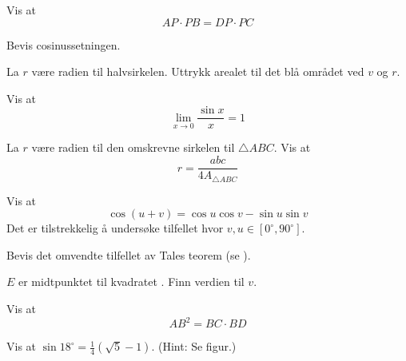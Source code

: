Vis at 
\[ AP\cdot PB = DP\cdot PC \]

\newpage
{}
Bevis cosinussetningen.

La $ r $ være radien til halvsirkelen. Uttrykk arealet til det blå området ved $ v $ og $ r $.

Vis at 
\[\lim\limits_{x\to0} \frac{\sin x}{x}=1 \]

La $ r $ være radien til den omskrevne sirkelen til $ \triangle ABC $. Vis at
\[ r=\frac{abc}{4A_{\triangle ABC}} \]

Vis at
\[ \cos(u+v)= \cos u\cos v-\sin u \sin v \]
Det er tilstrekkelig å undersøke tilfellet hvor $ v,u \in [0^\circ, 90^\circ] $.

Bevis det omvendte tilfellet av Tales teorem (se  ).


$ E $ er midtpunktet til kvadratet . Finn verdien til $ v $.

Vis at
\[ AB^2 = BC\cdot BD \]

Vis at $ \sin 18^\circ=\frac{1}{4}(\sqrt{5}-1) $. (Hint: Se figur.)






